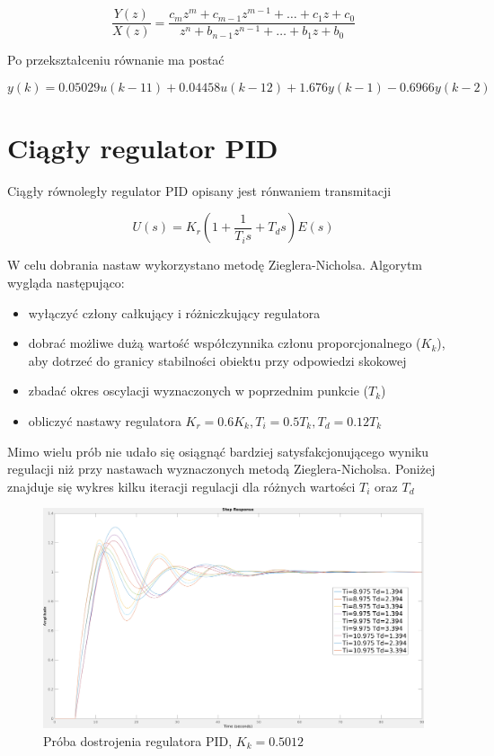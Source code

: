 \documentclass[fleqn]{article}
\begin{document}
{\Large
\begin{equation}
	\frac{Y(z)}{X(z)}=\frac{c_mz^m + c_{m-1}z^{m-1}+\dots+c_1z+c_0}{z^n+b_{n-1}z^{n-1}+\dots+b_1z+b_0}
\end{equation}}

Po przekształceniu równanie ma postać

{\Large
\begin{equation}
	y(k)=0.05029u(k-11)+0.04458u(k-12)+1.676y(k-1)-0.6966y(k-2)
\end{equation}
}
\pagebreak

\section{Ciągły regulator PID}

Ciągły równoległy regulator PID opisany jest rónwaniem transmitacji

{\Large
\begin{equation}
	U(s)=K_r(1+\frac{1}{T_is}+T_ds)E(s)
\end{equation}
}

W celu dobrania nastaw wykorzystano metodę Zieglera-Nicholsa. Algorytm wygląda następująco:
\begin{itemize}
	\item wyłączyć człony całkujący i różniczkujący regulatora
	\item dobrać możliwe dużą wartość współczynnika członu proporcjonalnego ($K_k$), aby dotrzeć do granicy stabilności obiektu przy odpowiedzi skokowej
	\item zbadać okres oscylacji wyznaczonych w poprzednim punkcie ($T_k$)
	\item obliczyć nastawy regulatora $K_r=0.6K_k, T_i=0.5T_k, T_d=0.12T_k$
\end{itemize}

Mimo wielu prób nie udało się osiągnąć bardziej satysfakcjonującego wyniku regulacji niż przy nastawach wyznaczonych metodą Zieglera-Nicholsa. Poniżej znajduje się wykres kilku iteracji regulacji dla różnych wartości $T_i$ oraz $T_d$

\begin{figure}[H]
	\includegraphics[width=\textwidth]{scripts/odpowiedzskokZN.png}
	\caption{Próba dostrojenia regulatora PID, $K_k = 0.5012$}
\end{figure}
\end{document}
